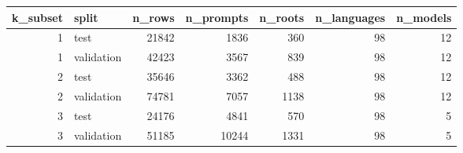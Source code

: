 \begin{tabular}{rlrrrrr}
\toprule
k\_subset & split & n\_rows & n\_prompts & n\_roots & n\_languages & n\_models \\
\midrule
1 & test & 21842 & 1836 & 360 & 98 & 12 \\
1 & validation & 42423 & 3567 & 839 & 98 & 12 \\
2 & test & 35646 & 3362 & 488 & 98 & 12 \\
2 & validation & 74781 & 7057 & 1138 & 98 & 12 \\
3 & test & 24176 & 4841 & 570 & 98 & 5 \\
3 & validation & 51185 & 10244 & 1331 & 98 & 5 \\
\bottomrule
\end{tabular}
